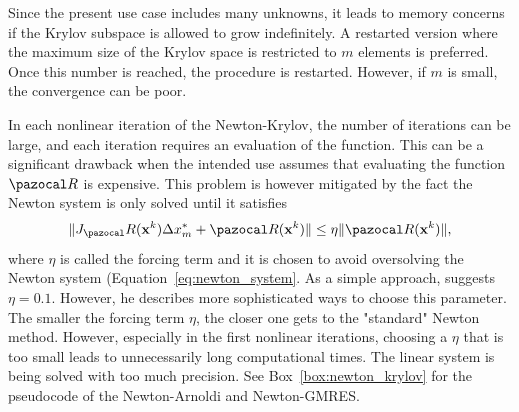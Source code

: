 Since the present use case includes many unknowns, it leads to memory concerns if the Krylov subspace is allowed to grow indefinitely.
A restarted version where the maximum size of the Krylov space is restricted to \(m\) elements is preferred.
Once this number is reached, the procedure is restarted.
However, if \(m\) is small, the convergence can be poor.

In each nonlinear iteration of the Newton-Krylov, the number of iterations can be large, and each iteration requires an evaluation of the function.
This can be a significant drawback when the intended use assumes that evaluating the function \(\pazocal R\) is expensive.
This problem is however mitigated by the fact the Newton system is only solved until it satisfies
\begin{equation}
  \|J_\pazocal R(\mathbf x^k) \Delta x^*_m+ \pazocal R(\mathbf x^k)\| \leq \eta\|\pazocal R(\mathbf x^k)\|,
\end{equation}
where \(\eta\) is called the forcing term and it is chosen to avoid oversolving the Newton system (Equation~\eqref{eq:newton_system}.
As a simple approach, \cite{kelley_solving_2003} suggests \(\eta=0.1\). However, he describes more sophisticated ways to choose this parameter.
The smaller the forcing term \(\eta\), the closer one gets to the "standard" Newton method.
However, especially in the first nonlinear iterations, choosing a \(\eta\) that is too small leads to unnecessarily long computational times. The linear system is being solved with too much precision.
See Box~\ref{box:newton_krylov} for the pseudocode of the Newton-Arnoldi and Newton-GMRES.

